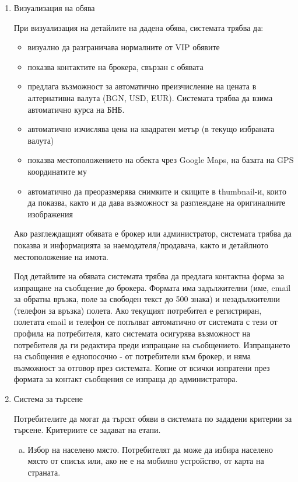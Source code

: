 \documentclass[]{article}
\begin{document}
\begin{enumerate}[I.]
{\begin{enumerate}[1.]
{				Информацията за наемодателя/продавача и детайлното местоположение е достъпна само за брокерите и администратора.
			}
			
			\item {Визуализация на обява

				При визуализация на детайлите на дадена обява, системата трябва да:
				\begin{itemize}
					\item визуално да разграничава нормалните от VIP обявите
					\item показва контактите на брокера, свързан с обявата
					\item предлага възможност за автоматично преизчисление на цената в алтернативна валута (BGN, USD, EUR).				Системата трябва да взима автоматично курса на БНБ.
					\item автоматично изчислява цена на квадратен метър (в текущо избраната валута)
					\item показва местоположението на обекта чрез Google Maps, на базата на GPS координатите му
					\item автоматично да преоразмерява снимките и скиците в thumbnail-и, които да показва, както и да дава възможност за разглеждане на оригиналните изображения			
				\end{itemize}
				
				Ако разглеждащият обявата е брокер или администратор, системата трябва да показва и информацията за наемодателя/продавача, както и детайлното местоположение на имота.
				
				Под детайлите на обявата системата трябва да предлага контактна форма за изпращане на съобщение до брокера. Формата има задължителни (име, email за обратна връзка, поле за свободен текст до 500 знака) и незадължителни (телефон за връзка) полета. Ако текущият потребител е регистриран, полетата email и телефон се попълват автоматично от системата с тези от профила на потребителя, като системата осигурява възможност на потребителя да ги редактира преди изпращане на съобщението. Изпращането на съобщения е еднопосочно - от потребители към брокер, и няма възможност за отговор през системата. Копие от всички изпратени през формата за контакт съобщения се изпраща до администратора.
			}

			\item {Система за търсене

Потребителите да могат да търсят обяви в системата по зададени критерии за търсене. Критериите се задават на етапи.
\begin{enumerate}[a) ]
\item Избор на населено място. Потребителят да може да избира населено място от списък  или, ако не е на мобилно устройство, от карта на страната. 


\end{enumerate}}
\end{enumerate}}
\end{enumerate}
\end{document}
